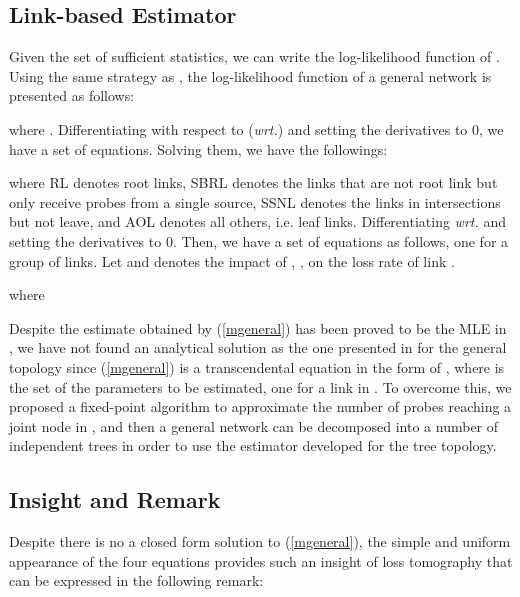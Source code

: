 \documentclass[10pt,twocolumn]{IEEEtran}
\begin{document}
\subsection{Link-based Estimator}

Given the set of sufficient statistics, we can write the
log-likelihood function of . Using the same strategy as
\cite{Zhu06}, the log-likelihood function of a general network is
presented as follows:

\noindent where .
Differentiating  with respect to ({\it wrt.}) 
and setting the derivatives to 0, we have a set of equations. Solving
them, we have the followings:




\noindent where RL denotes root links, SBRL denotes the links that are
not root link but only receive probes from a single source, SSNL
denotes the links in intersections but not leave, and AOL denotes all
others, i.e. leaf links. Differentiating  {\it wrt.}
 and setting the derivatives to 0. Then, we have a set of
equations as follows, one for a group of links. Let   and  denotes the impact of , ,
 on the loss rate of link .

\noindent where


Despite the estimate obtained by (\ref{mgeneral}) has been proved to
be the MLE in \cite{ZD09}, we have not found an analytical solution as
the one presented in \cite{ZD09} for the general topology since
(\ref{mgeneral}) is a transcendental equation in the form of
, where  is the set of the parameters to
be estimated, one for a link in . To overcome this, we proposed a
fixed-point algorithm to approximate the number of probes reaching a
joint node in \cite{ZD09}, and then a general network can be
decomposed into a number of independent trees in order to use the
estimator developed for the tree topology.

\subsection{Insight and Remark}

Despite there is no a closed form solution to (\ref{mgeneral}),  the
simple and uniform appearance of the four equations provides such an
insight of loss tomography that can be expressed in the following
remark:
\end{document}
